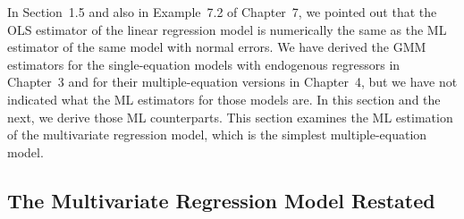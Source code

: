 
In Section~1.5 and also in Example~7.2 of Chapter~7, we pointed out that the OLS
estimator of the linear regression model is numerically the same as the ML estimator of the same model with normal errors. We have derived the GMM estimators
for the single-equation models with endogenous regressors in Chapter~3 and for
their multiple-equation versions in Chapter~4, but we have not indicated what the
ML estimators for those models are. In this section and the next, we derive those
ML counterparts. This section examines the ML estimation of the multivariate
regression model, which is the simplest multiple-equation model.

\subsection*{The Multivariate Regression Model Restated}

